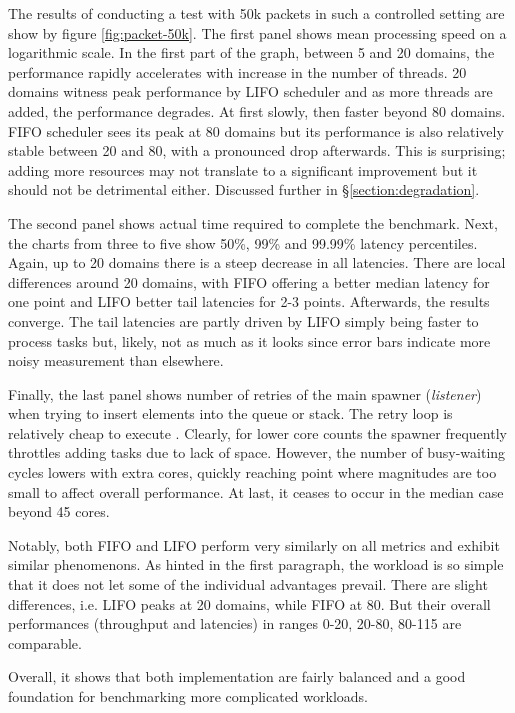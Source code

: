\documentclass[12pt,a4paper,twoside]{report}
\begin{document}
The results of conducting a test with 50k packets in such a controlled setting are show by figure \ref{fig:packet-50k}. The first panel shows mean processing speed on a logarithmic scale. In the first part of the graph, between 5 and 20 domains, the performance rapidly accelerates with increase in the number of threads. 20 domains witness peak performance by LIFO scheduler and as more threads are added, the performance degrades. At first slowly, then faster beyond 80 domains. FIFO scheduler sees its peak at 80 domains but its performance is also relatively stable between 20 and 80, with a pronounced drop afterwards. This is surprising; adding more resources may not translate to a significant improvement \cite{amdahl} but it should not be detrimental either. Discussed further in \S\ref{section:degradation}. 

The second panel shows actual time required to complete the benchmark. Next, the charts from three to five show 50\%, 99\% and 99.99\% latency percentiles. Again, up to 20 domains there is a steep decrease in all latencies. There are local differences around 20 domains, with FIFO offering a better median latency for one point and LIFO better tail latencies for 2-3 points. Afterwards, the results converge. The tail latencies are partly driven by LIFO simply being faster to process tasks but, likely, not as much as it looks since error bars indicate more noisy measurement than elsewhere. 

Finally, the last panel shows number of retries of the main spawner (\textit{listener}) when trying to insert elements into the queue or stack. The retry loop is relatively cheap to execute . Clearly, for lower core counts the spawner frequently throttles adding tasks due to lack of space. However, the number of busy-waiting cycles lowers with extra cores, quickly reaching point where magnitudes are too small to affect overall performance. At last, it ceases to occur in the median case beyond 45 cores. 
 
Notably, both FIFO and LIFO perform very similarly on all metrics and exhibit similar phenomenons. As hinted in the first paragraph, the workload is so simple that it does not let some of the individual advantages prevail. There are slight differences, i.e. LIFO peaks at 20 domains, while FIFO at 80. But their overall performances (throughput and latencies) in ranges 0-20, 20-80, 80-115 are comparable. 

Overall, it shows that both implementation are fairly balanced and a good foundation for benchmarking more complicated workloads.
\end{document}
